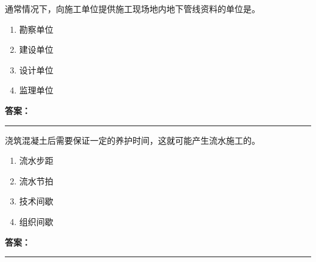 \documentclass[UTF8,fontset=fandol,11pt]{ctexart}
\newcommand{\answerline}{\textcolor{answerred}{\rule{2.4cm}{0.7pt}}}
\begin{document}
\vspace{0.2em}

\begin{quizbox}[title={乱序第 148 题｜第一章土方工程}]

通常情况下，向施工单位提供施工现场地内地下管线资料的单位是。\\

\begin{enumerate}[label=\Alph*.]

\item 勘察单位

\item 建设单位

\item 设计单位

\item 监理单位

\end{enumerate}

\textbf{\textcolor{answerred}{答案：}} \answerline

\end{quizbox}

\vspace{0.2em}

\begin{quizbox}[title={乱序第 149 题｜第十章流水施工原理}]

浇筑混凝土后需要保证一定的养护时间，这就可能产生流水施工的。\\

\begin{enumerate}[label=\Alph*.]

\item 流水步距

\item 流水节拍

\item 技术间歇

\item 组织间歇

\end{enumerate}

\textbf{\textcolor{answerred}{答案：}} \answerline

\end{quizbox}

\vspace{0.2em}
\end{document}
